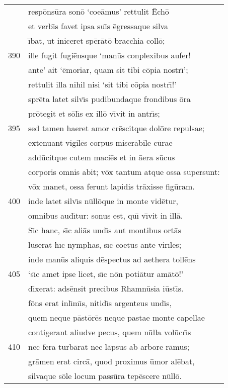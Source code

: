 \documentclass[paper=6in:9in,pagesize=pdftex,
               headinclude=on,footinclude=on,12pt]{scrbook}
\begin{document}
\begin{longtable}[p]{ r l }
 & resp\=ons\=ura son\=o `coe\=amus' rettulit \=Ech\=o\\ 
 & et verb\={\i}s favet ipsa su\={\i}s \=egressaque silva\\ 
 & \={\i}bat, ut iniceret sp\=er\=at\=o bracchia coll\=o;\\ 
390 & ille fugit fugi\=ensque `man\=us conplexibus aufer!\\ 
 & ante' ait `\=emoriar, quam sit tibi c\=opia nostr\={\i}';\\ 
 & rettulit illa nihil nisi `sit tibi c\=opia nostr\={\i}!'\\ 
 & spr\=eta latet silv\={\i}s pudibundaque frondibus \=ora\\ 
 & pr\=otegit et s\=ol\={\i}s ex ill\=o v\={\i}vit in antr\={\i}s;\\ 
395 & sed tamen haeret amor cr\=escitque dol\=ore repulsae;\\ 
 & extenuant vigil\=es corpus miser\=abile c\=urae\\ 
 & add\=ucitque cutem maci\=es et in \=aera s\=ucus\\ 
 & corporis omnis abit; v\=ox tantum atque ossa supersunt:\\ 
 & v\=ox manet, ossa ferunt lapidis tr\=axisse fig\=uram.\\ 
400 & inde latet silv\={\i}s n\=ull\=oque in monte vid\=etur,\\ 
 & omnibus aud\={\i}tur: sonus est, qu\={\i} v\={\i}vit in ill\=a.\\ 
 & \indent S\={\i}c hanc, s\={\i}c ali\=as und\={\i}s aut montibus ort\=as\\ 
 & l\=userat h\={\i}c nymph\=as, s\={\i}c coet\=us ante vir\={\i}l\=es;\\ 
 & inde man\=us aliquis d\=espectus ad aethera toll\=ens\\ 
405 & `s\={\i}c amet ipse licet, s\={\i}c n\=on poti\=atur am\=at\=o!'\\ 
 & d\={\i}xerat: ads\=ensit precibus Rhamn\=usia i\=ust\={\i}s.\\ 
 & f\=ons erat inl\={\i}m\={\i}s, nitid\={\i}s argenteus und\={\i}s,\\ 
 & quem neque p\=ast\=or\=es neque pastae monte capellae\\ 
 & contigerant aliudve pecus, quem n\=ulla vol\=ucr\={\i}s\\ 
410 & nec fera turb\=arat nec l\=apsus ab arbore r\=amus;\\ 
 & gr\=amen erat circ\=a, quod proximus \=umor al\=ebat,\\ 
 & silvaque s\=ole locum pass\=ura tep\=escere n\=ull\=o.\\ 

\end{longtable}
\end{document}
